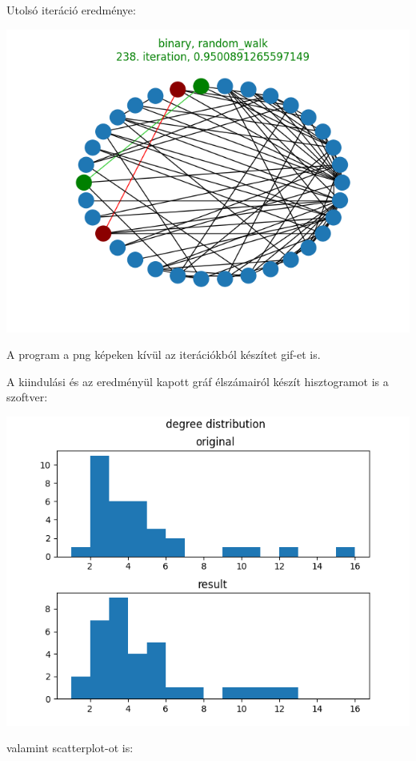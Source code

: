 \documentclass[12pt,numbers=noenddot]{report}
\begin{document}
\noindent
Utolsó iteráció eredménye:

\includegraphics[width=0.85\linewidth]{images/find_similar_end.png}

A program a png képeken kívül az iterációkból készítet gif-et is.

\pagebreak

A kiindulási és az eredményül kapott gráf élszámairól készít hisztogramot is
a szoftver:

\hspace{1cm}

\includegraphics[width=0.95\linewidth]{images/find_similar_histogram.png}

\noindent
valamint scatterplot-ot is:
\end{document}
